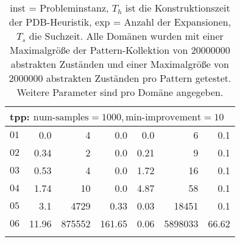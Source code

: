\begin{longtable}{|c||r|r|r||r|r|r|}
\multicolumn{7}{|l|}{tpp: $\text{num-samples}=1000,\text{min-improvement}=10$}\\\hline
$01$ & 0.0 & 4 & 0.0 & 0.0 & 6 & 0.1 \\\hline
$02$ & 0.34 & 2 & 0.0 & 0.21 & 9 & 0.1 \\\hline
$03$ & 0.53 & 4 & 0.0 & 1.72 & 16 & 0.1 \\\hline
$04$ & 1.74 & 10 & 0.0 & 4.87 & 58 & 0.1 \\\hline
$05$ & 3.1 & 4729 & 0.33 & 0.03 & 18451 & 0.1 \\\hline
$06$ & 11.96 & 875552 & 161.65 & 0.06 & 5898033 & 66.62 \\\hline

\caption{inst = Probleminstanz, $T_h$ ist die Konstruktionszeit der PDB-Heuristik, exp = Anzahl der Expansionen, $T_s$
die Suchzeit. Alle Domänen wurden mit einer Maximalgröße der Pattern-Kollektion von $20000000$ abstrakten Zuständen und 
einer Maximalgröße von $2000000$ abstrakten Zuständen pro Pattern getestet. Weitere Parameter sind pro Domäne angegeben.}
\end{longtable}